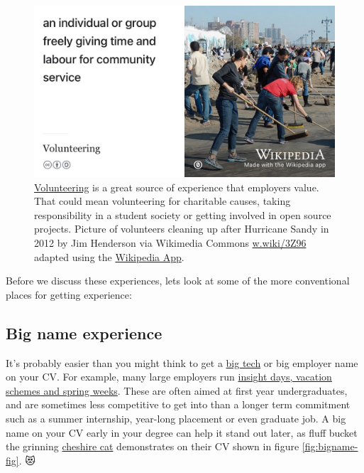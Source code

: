 \documentclass[
]{book}
\begin{document}
\begin{figure}

{\centering \includegraphics[width=1\linewidth]{images/volunthero} 

}

\caption{\href{https://en.wikipedia.org/wiki/Volunteering}{Volunteering} is a great source of experience that employers value. That could mean volunteering for charitable causes, taking responsibility in a student society or getting involved in open source projects. Picture of volunteers cleaning up after Hurricane Sandy in 2012 by Jim Henderson via Wikimedia Commons \href{https://w.wiki/3Z96}{w.wiki/3Z96} adapted using the \href{https://apps.apple.com/us/app/wikipedia/id324715238}{Wikipedia App}.}\label{fig:volunthero-fig}
\end{figure}



Before we discuss these experiences, lets look at some of the more conventional places for getting experience:

\hypertarget{bignames}{%
\subsection{Big name experience}\label{bignames}}

It's probably easier than you might think to get a \href{https://en.wikipedia.org/wiki/Big_Tech}{big tech} or big employer name on your CV. For example, many large employers run \href{https://www.ratemyplacement.co.uk/insights}{insight days, vacation schemes and spring weeks}. These are often aimed at first year undergraduates, and are sometimes less competitive to get into than a longer term commitment such as a summer internship, year-long placement or even graduate job. A big name on your CV early in your degree can help it stand out later, as fluff bucket the grinning \href{https://en.wikipedia.org/wiki/Cheshire_Cat}{cheshire cat} demonstrates on their CV shown in figure \ref{fig:bigname-fig}. 😻
\end{document}
